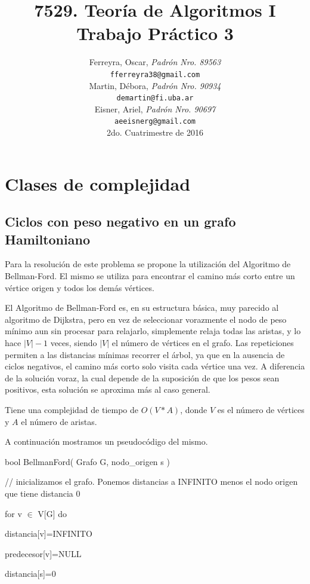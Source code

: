 \documentclass[a4paper,10pt]{article}
\title{
\textbf{ 
	7529. Teoría de Algoritmos I\\
	Trabajo Práctico 3
	}
}
\author{ Ferreyra, Oscar, \textit{Padrón Nro. 89563} \\
\texttt{ fferreyra38@gmail.com } \\[2.5ex]
Martin, Débora, \textit{Padrón Nro. 90934} \\
\texttt{ demartin@fi.uba.ar } \\[2.5ex]
Eisner, Ariel, \textit{Padrón Nro. 90697} \\
\texttt{ aeeisnerg@gmail.com } \\[2.5ex]
\normalsize{2do. Cuatrimestre de 2016} \\
}
\date{}
\begin{document}
\maketitle

\thispagestyle{empty} %
\setcounter{page}{0}
\newpage
\tableofcontents

\newpage

\section{Clases de complejidad}


\subsection{Ciclos con peso negativo en un grafo Hamiltoniano}
Para la resolución de este problema se propone la utilización del Algoritmo de Bellman-Ford. El mismo se utiliza para encontrar el camino más corto entre un vértice origen y todos los demás vértices.

El Algoritmo de Bellman-Ford es, en su estructura básica, muy parecido al algoritmo de Dijkstra, pero en vez de seleccionar vorazmente el nodo de peso mínimo aun sin procesar para relajarlo, simplemente relaja todas las aristas, y lo hace \(|V|-1\) veces, siendo \(|V|\) el número de vértices en el grafo. Las repeticiones permiten a las distancias mínimas recorrer el árbol, ya que en la ausencia de ciclos negativos, el camino más corto solo visita cada vértice una vez. A diferencia de la solución voraz, la cual depende de la suposición de que los pesos sean positivos, esta solución se aproxima más al caso general.

Tiene una complejidad de tiempo de \(O(V*A)\), donde \(V\) es el número de vértices y \(A\) el número de aristas.

A continuación mostramos un pseudocódigo del mismo.

\bigskip

bool BellmanFord( Grafo G, nodo\_origen s )

\quad // inicializamos el grafo. Ponemos distancias a INFINITO menos el nodo origen que tiene distancia 0

\quad for v \(\in\) V[G] do
           
\quad \quad distancia[v]=INFINITO
           
\quad\quad  predecesor[v]=NULL
       
\quad distancia[s]=0
      
\end{document}
